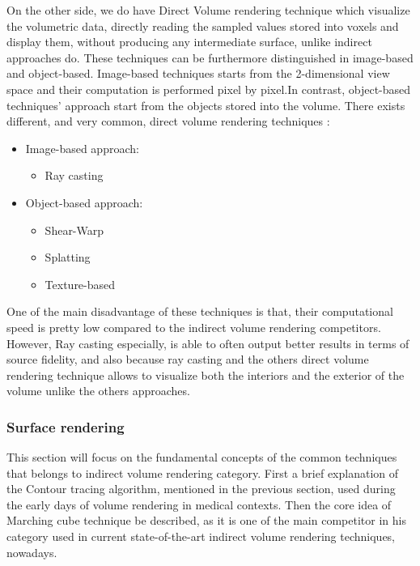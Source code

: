 \documentclass[10pt,a4paper]{article}
\begin{document}
On the other side, we do have Direct Volume rendering technique which visualize the volumetric data, directly reading the sampled values stored into voxels and display them, without producing any intermediate surface, unlike indirect approaches do. These techniques can be furthermore distinguished in image-based and object-based. Image-based techniques starts from the 2-dimensional view space and their computation is performed pixel by pixel.In contrast, object-based techniques' approach start from the objects stored into the volume. There exists different, and very common, direct volume rendering techniques :
\begin{itemize}
\item Image-based approach:
\begin{itemize}
\item Ray casting
\end{itemize}
\item Object-based approach:
\begin{itemize}
\item Shear-Warp
\item Splatting
\item Texture-based
\end{itemize}
\end{itemize}

One of the main disadvantage of these techniques is that, their computational speed is pretty low compared to the indirect volume rendering competitors. However, Ray casting especially, is able to often output better results in terms of source fidelity, and also because ray casting and the others direct volume rendering technique allows to visualize both the interiors and the exterior of the volume unlike the others approaches.

\subsubsection{Surface rendering} %
This section will focus on the fundamental concepts of the common techniques that belongs to indirect volume rendering category. First a brief explanation of the Contour tracing algorithm, mentioned in the previous section, used during the early days of volume rendering in medical contexts. Then the core idea of Marching cube technique be described, as it is one of the main competitor in his category used in current state-of-the-art indirect volume rendering techniques, nowadays.\\
\end{document}
